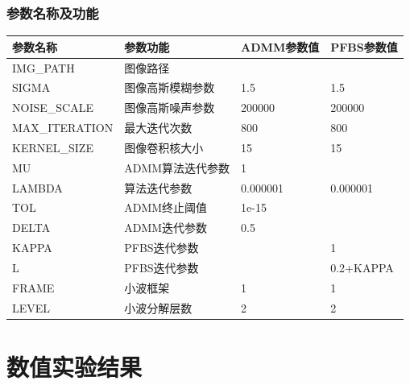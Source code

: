 \documentclass[a4paper, UTF8]{ctexrep}
\begin{document}
		\subsubsection{参数名称及功能} %
		\label{ssub:参数名称及功能}
			\begin{table}[htbp!]
				\centering
				\begin{tabular}{llll}
					\hline
					参数名称 & 参数功能 & ADMM参数值 & PFBS参数值 \\
					\hline
					IMG\_PATH & 图像路径 & 　　\\
					SIGMA & 图像高斯模糊参数 & 1.5 & 1.5 \\
					NOISE\_SCALE & 图像高斯噪声参数 & 200000 & 200000\\
					MAX\_ITERATION & 最大迭代次数 & 800 & 800\\
					KERNEL\_SIZE & 图像卷积核大小 & 15 & 15 \\
					MU & ADMM算法迭代参数 & 1 &   \\
					LAMBDA & 算法迭代参数 & 0.000001 & 0.000001 \\
					TOL & ADMM终止阈值 & 1e-15 &   \\
					DELTA & ADMM迭代参数 & 0.5 &   \\
					KAPPA & PFBS迭代参数 &  &1 \\
					L & PFBS迭代参数 &  & 0.2+KAPPA \\
					FRAME & 小波框架 & 1 & 1 \\
					LEVEL & 小波分解层数 & 2 & 2 \\
					\hline
				\end{tabular}
			\end{table}
		
	\section{数值实验结果} %
\end{document}
